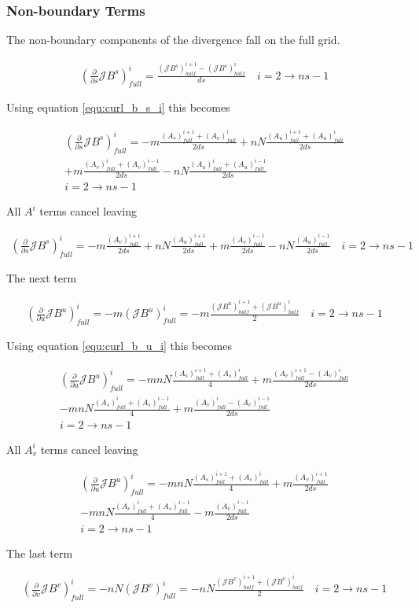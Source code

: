 \documentclass[11pt]{article}
\newcommand{\brackets}[1]{\left(#1\right)}
\newcommand{\equ}[2]{
	\begin{equation}
    \begin{split}
	#1
	\label{#2}
	\end{split}
	\end{equation}
}
\begin{document}
\subsubsection{Non-boundary Terms}
The non-boundary components of the divergence fall on the full grid.
\equ{
\brackets{\frac{\partial}{\partial s}\mathcal{J}B^{s}}^{i}_{full}=\frac{\brackets{\mathcal{J}B^{s}}^{i+1}_{half}-\brackets{\mathcal{J}B^{s}}^{i}_{half}}{ds}\quad i=2\rightarrow ns-1
}{equ:div_jb_s}
Using equation \ref{equ:curl_b_s_i} this becomes
\equ{
\brackets{\frac{\partial}{\partial s}\mathcal{J}B^{s}}^{i}_{full}=-m\frac{\brackets{A_{v}}^{i+1}_{full}+\brackets{A_{v}}^{i}_{full}}{2ds}+nN\frac{\brackets{A_{u}}^{i+1}_{full}+\brackets{A_{u}}^{i}_{full}}{2ds}\\
+m\frac{\brackets{A_{v}}^{i}_{full}+\brackets{A_{v}}^{i-1}_{full}}{2ds}-nN\frac{\brackets{A_{u}}^{i}_{full}+\brackets{A_{u}}^{i-1}_{full}}{2ds}\\i=2\rightarrow ns-1
}{equ:div_jb_s_1}
All $A^{i}$ terms cancel leaving
\equ{
\brackets{\frac{\partial}{\partial s}\mathcal{J}B^{s}}^{i}_{full}=-m\frac{\brackets{A_{v}}^{i+1}_{full}}{2ds}+nN\frac{\brackets{A_{u}}^{i+1}_{full}}{2ds}+m\frac{\brackets{A_{v}}^{i-1}_{full}}{2ds}-nN\frac{\brackets{A_{u}}^{i-1}_{full}}{2ds}\quad i=2\rightarrow ns-1
}{equ:div_jb_s_2}
The next term
\equ{
\brackets{\frac{\partial}{\partial u}\mathcal{J}B^{u}}^{i}_{full}=-m\brackets{\mathcal{J}B^{u}}^{i}_{full}=
-m\frac{\brackets{\mathcal{J}B^{u}}^{i+1}_{half} + \brackets{\mathcal{J}B^{u}}^{i}_{half}}{2}\quad i=2\rightarrow ns-1
}{equ:div_jb_u}
Using equation \ref{equ:curl_b_u_i} this becomes
\equ{
\brackets{\frac{\partial}{\partial u}\mathcal{J}B^{u}}^{i}_{full}=-mnN\frac{\brackets{A_{s}}^{i+1}_{full}+\brackets{A_{s}}^{i}_{full}}{4}+m\frac{\brackets{A_{v}}^{i+1}_{full}-\brackets{A_{v}}^{i}_{full}}{2ds}\\
-mnN\frac{\brackets{A_{s}}^{i}_{full}+\brackets{A_{s}}^{i-1}_{full}}{4}+m\frac{\brackets{A_{v}}^{i}_{full}-\brackets{A_{v}}^{i-1}_{full}}{2ds}\\
i=2\rightarrow ns-1
}{equ:div_jb_u_1}
All $A^{i}_{v}$ terms cancel leaving
\equ{
\brackets{\frac{\partial}{\partial u}\mathcal{J}B^{u}}^{i}_{full}=-mnN\frac{\brackets{A_{s}}^{i+1}_{full}+\brackets{A_{s}}^{i}_{full}}{4}+m\frac{\brackets{A_{v}}^{i+1}_{full}}{2ds}\\
-mnN\frac{\brackets{A_{s}}^{i}_{full}+\brackets{A_{s}}^{i-1}_{full}}{4}-m\frac{\brackets{A_{v}}^{i-1}_{full}}{2ds}\\
i=2\rightarrow ns-1
}{equ:div_jb_u_2}
The last term
\equ{
\brackets{\frac{\partial}{\partial v}\mathcal{J}B^{v}}^{i}_{full}=-nN\brackets{\mathcal{J}B^{v}}^{i}_{full}=
-nN\frac{\brackets{\mathcal{J}B^{v}}^{i+1}_{half} + \brackets{\mathcal{J}B^{v}}^{i}_{half}}{2}\quad i=2\rightarrow ns-1
}{equ:div_jb_v}
\end{document}
